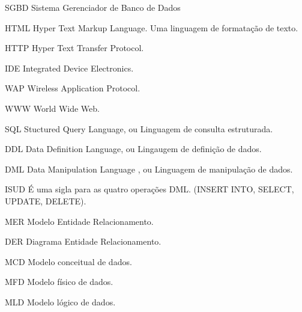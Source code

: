 \begin{siglas}
	\item[SGBD] Sistema Gerenciador de Banco de Dados
	\item[HTML] Hyper Text Markup Language. Uma linguagem de formatação de texto.
	\item[HTTP] Hyper Text Transfer Protocol.
	\item[IDE]	Integrated Device Electronics.
	\item[WAP]	Wireless Application Protocol.
	\item[WWW]	World Wide Web.
	\item[SQL]	Stuctured Query Language, ou Linguagem de consulta estruturada.
	\item[DDL]	Data Definition Language, ou Lingaugem de definição de dados.
	\item[DML]	Data Manipulation Language , ou Linguagem de manipulação de dados.
	\item[ISUD]	É uma sigla para as quatro operações DML. (INSERT INTO, SELECT, UPDATE, DELETE).
	\item[MER]	Modelo Entidade Relacionamento. 
	\item[DER]	Diagrama Entidade Relacionamento.
	\item[MCD]	Modelo conceitual de dados. 
	\item[MFD]	Modelo físico de dados. 
	\item[MLD]	Modelo lógico de dados. 

	
\end{siglas}